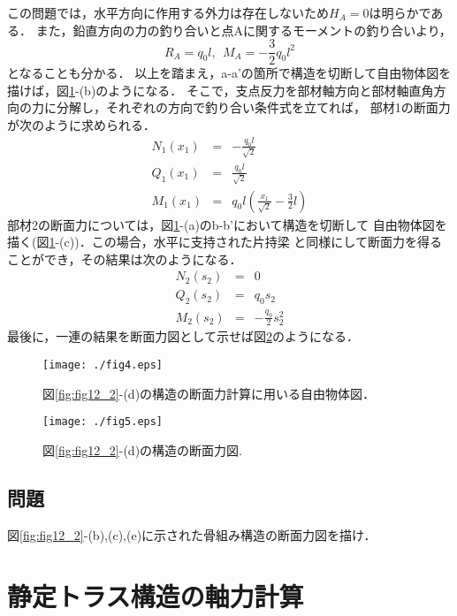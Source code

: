 ﻿\documentclass[10pt,a4j]{jbook}
\begin{document}
この問題では，水平方向に作用する外力は存在しないため$H_A=0$は明らかである．
また，鉛直方向の力の釣り合いと点Aに関するモーメントの釣り合いより，
\begin{equation}
	R_A=q_0l, \ \ M_A=-\frac{3}{2}q_0l^2
\end{equation}
となることも分かる．
以上を踏まえ，a-a'の箇所で構造を切断して自由物体図を描けば，図\ref{fig:fig12_4}-(b)のようになる．
そこで，支点反力を部材軸方向と部材軸直角方向の力に分解し，それぞれの方向で釣り合い条件式を立てれば，
部材1の断面力が次のように求められる．
\begin{eqnarray}
	N_1(x_1) &= & -\frac{q_0l}{\sqrt{2}} 
	\\
	Q_1(x_1) &= & \frac{q_0l}{\sqrt{2}} 
	\\
	M_1(x_1) &= & q_0l \left( \frac{x_1}{\sqrt{2}}-\frac{3}{2}l\right) 
\end{eqnarray}
部材2の断面力については，図\ref{fig:fig12_4}-(a)のb-b'において構造を切断して
自由物体図を描く(図\ref{fig:fig12_4}-(c))．この場合，水平に支持された片持梁
と同様にして断面力を得ることができ，その結果は次のようになる．
\begin{eqnarray}
	N_2(s_2) &= & 0
	\\
	Q_2(s_2) &= & q_0s_2
	\\
	M_2(s_2) &= & -\frac{q_0}{2}s_2^2
\end{eqnarray}
最後に，一連の結果を断面力図として示せば図\ref{fig:fig12_5}のようになる．
\begin{figure}[h]
	\begin{center}
	\texttt{[image: ./fig4.eps]} 
	\end{center}
	\caption{
		図\ref{fig:fig12_2}-(d)の構造の断面力計算に用いる自由物体図．
	} 
	\label{fig:fig12_4}
\end{figure}
\begin{figure}[h]
	\begin{center}
	\texttt{[image: ./fig5.eps]} 
	\end{center}
	\caption{
		図\ref{fig:fig12_2}-(d)の構造の断面力図.
	} 
	\label{fig:fig12_5}
\end{figure}
\subsection{問題}
図\ref{fig:fig12_2}-(b),(c),(e)に示された骨組み構造の断面力図を描け．
\section{静定トラス構造の軸力計算}
\end{document}
